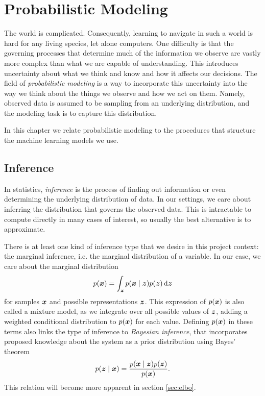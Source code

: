 \chapter{Probabilistic Modeling}
\label{chapter:probabilistic_modelling}

The world is complicated. Consequently, learning to navigate in such a world is hard for any living species, let alone computers. One difficulty is that the governing processes that determine much of the information we observe are vastly more complex than what we are capable of understanding. This introduces uncertainty about what we think and know and how it affects our decisions. The field of \textit{probabilistic modeling} is a way to incorporate this uncertainty into the way we think about the things we observe and how we act on them. Namely, observed data is assumed to be sampling from an underlying distribution, and the modeling task is to capture this distribution.

In this chapter we relate probabilistic modeling to the procedures that structure the machine learning models we use.

\section{Inference}
In statistics, \textit{inference} is the process of finding out information or even determining the underlying distribution of data. In our settings, we care about inferring the distribution that governs the observed data. This is intractable to compute directly in many cases of interest, so usually the best alternative is to approximate.

There is at least one kind of inference type that we desire in this project context: the marginal inference, i.e. the marginal distribution of a variable. In our case, we care about the marginal distribution 
\begin{equation}
    p(\bm{ x }) = \int_{\bm{ z }} p(\bm{ x } \mid \bm{ z }) p(\bm{ z }) \mathop{}\!\mathrm{d} \bm{ z } \label{eq:marginal_distribution}
\end{equation}
for samples $\bm{ x }$ and possible representations $\bm{ z }$. This expression of $p(\bm{ x })$ is also called a mixture model, as we integrate over all possible values of $\bm{ z }$, adding a weighted conditional distribution to $p(\bm{ x })$ for each value. Defining $p(\bm{ x })$ in these terms also links the type of inference to \textit{Bayesian inference}, that incorporates proposed knowledge about the system as a prior distribution using Bayes' theorem
\begin{equation}
    p(\bm{ z } \mid \bm{ x }) = \frac{p(\bm{ x } \mid \bm{ z }) p(\bm{ z })}{p(\bm{ x })}. \label{eq:bayes_theorem}
\end{equation}
This relation will become more apparent in section \ref{sec:elbo}.

